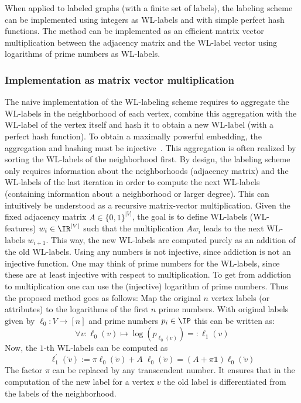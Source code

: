 When applied to labeled graphs (with a finite set of labels), the labeling scheme can be implemented using integers as WL-labels and with simple perfect hash functions. 
The method can be implemented as an efficient matrix vector multiplication between the adjacency matrix and the WL-label vector using logarithms of prime numbers as WL-labels.

\subsubsection{Implementation as matrix vector multiplication}

The naive implementation of the WL-labeling scheme requires to aggregate the WL-labels in the neighborhood of each vertex, combine this aggregation with the WL-label of the vertex itself and hash it to obtain a new WL-label (with a perfect hash function). 
To obtain a maximally powerful embedding, the aggregation and hashing must be injective~\cite{2019_Xu_CONF}. 
This aggregation is often realized by sorting the WL-labels of the neighborhood first.
By design, the labeling scheme only requires information about the neighborhoods (adjacency matrix) and the WL-labels of the last iteration in order to compute the next WL-labels (containing information about a neighborhood or larger degree).
This can intuitively be understood as a recursive matrix-vector multiplication.
Given the fixed adjacency matrix $A\in\{0,1\}^{|V|}$, the goal is to define WL-labels (WL-features) $w_i \in \IR^{|V|}$ such that the multiplication $A w_i$ leads to the next WL-labels $w_{i+1}$.
This way, the new WL-labels are computed purely as an addition of the old WL-labels.
Using any numbers is not injective, since addiction is not an injective function.
One may think of prime numbers for the WL-labels, since these are at least injective with respect to multiplication.
To get from addiction to multiplication one can use the (injective) logarithm of prime numbers.
Thus the proposed method goes as follows:
Map the original $n$ vertex labels (or attributes) to the logarithms of the first $n$ prime numbers. With original labels given by $\ell_0:V\to[n]$ and prime numbers $p_i\in\IP$ this can be written as: 
\[ \forall v: \ell_0(v) \mapsto \log(p_{\ell_0(v)}) =: \ell_1(v) \]
Now, the $1$-th WL-labels can be computed as
\[ \ell^{\prime}_{1}(\overleftarrow{v}) := \pi\ell_{0}(\overleftarrow{v}) + A \;\ell_{0}(\overleftarrow{v}) = (A+\pi\mathbb{1}) \ell_{0}(\overleftarrow{v})\]
The factor $\pi$ can be replaced by any transcendent number.
It ensures that in the computation of the new label for a vertex $v$ the old label is differentiated from the labels of the neighborhood.
